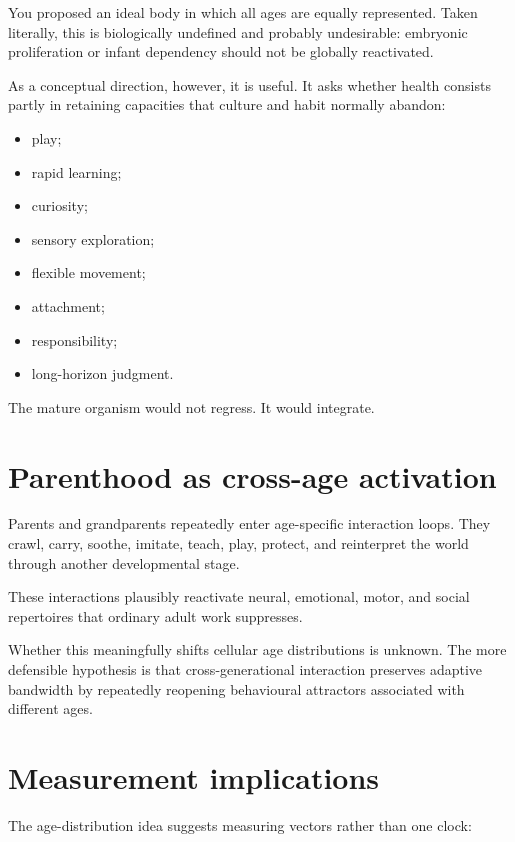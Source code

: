 You proposed an ideal body in which all ages are equally represented. Taken literally, this is biologically undefined and probably undesirable: embryonic proliferation or infant dependency should not be globally reactivated.

As a conceptual direction, however, it is useful. It asks whether health consists partly in retaining capacities that culture and habit normally abandon:

\begin{itemize}
\tightlist
\item
  play;
\item
  rapid learning;
\item
  curiosity;
\item
  sensory exploration;
\item
  flexible movement;
\item
  attachment;
\item
  responsibility;
\item
  long-horizon judgment.
\end{itemize}

The mature organism would not regress. It would integrate.

\section{Parenthood as cross-age activation}

Parents and grandparents repeatedly enter age-specific interaction loops. They crawl, carry, soothe, imitate, teach, play, protect, and reinterpret the world through another developmental stage.

These interactions plausibly reactivate neural, emotional, motor, and social repertoires that ordinary adult work suppresses.

Whether this meaningfully shifts cellular age distributions is unknown. The more defensible hypothesis is that cross-generational interaction preserves adaptive bandwidth by repeatedly reopening behavioural attractors associated with different ages.

\section{Measurement implications}

The age-distribution idea suggests measuring vectors rather than one clock:

